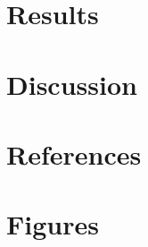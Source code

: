 \documentclass[letterpaper]{article}
\begin{document}
\section{Results}

\section{Discussion}

\section{References}

\section{Figures}
\end{document}
